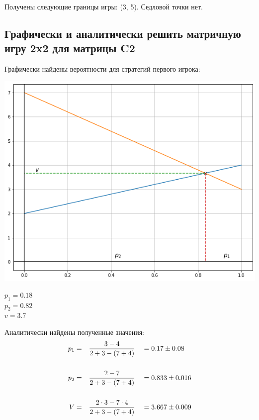 \documentclass[12pt,a4paper]{article}%
\begin{document}
Получены следующие границы игры: (3, 5). Седловой точки нет.

\subsection{Графически и аналитически решить матричную игру 2x2 для матрицы C2}
Графически найдены вероятности для стратегий первого игрока:
\begin{center}
  \includegraphics[scale=0.5]{C2.png}
\end{center}
$p_1 = 0.18$\\$p_2 = 0.82$\\$v = 3.7$

Аналитически найдены полученные значения:
$$
\begin{aligned}
  p_1 &= && \frac{3 - 4}                {2 + 3 - (7 + 4)} && = 0.17  \pm 0.08  \\ \vspace{0.5cm}\\
  p_2 &= && \frac{2 - 7}                {2 + 3 - (7 + 4)} && = 0.833 \pm 0.016 \\ \vspace{0.5cm}\\
  V   &= && \frac{2 \cdot 3 - 7 \cdot 4}{2 + 3 - (7 + 4)} && = 3.667 \pm 0.009
\end{aligned}
$$
\end{document}
